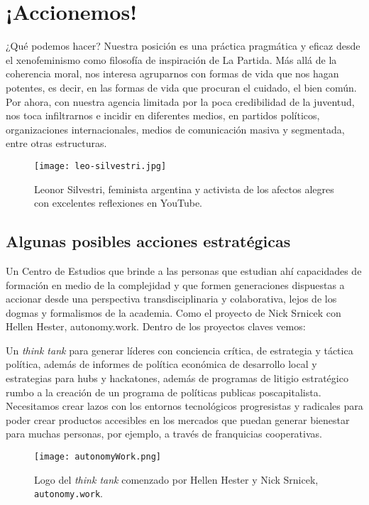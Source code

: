 \chapter{¡Accionemos!}
\label{cha:accionemos}

¿Qué podemos hacer? Nuestra posición es una práctica pragmática y eficaz desde el xenofeminismo como filosofía de inspiración de La Partida. Más allá de la coherencia moral, nos interesa agruparnos con formas de vida que nos hagan potentes, es decir, en las formas de vida que procuran el cuidado, el bien común. Por ahora, con nuestra agencia limitada por la poca credibilidad de la juventud, nos toca infiltrarnos e incidir en diferentes medios, en partidos políticos, organizaciones internacionales, medios de comunicación masiva y segmentada, entre otras estructuras.

\begin{figure}[htbp]
	\centering
	\texttt{[image: leo-silvestri.jpg]}
	\caption[Leonor Silvestri]{Leonor Silvestri, feminista argentina y activista de los afectos alegres con excelentes reflexiones en YouTube.}
	\label{fig:silvestri}
\end{figure}

\section{Algunas posibles acciones estratégicas}
\label{sec:posiblesacciones}

Un Centro de Estudios que brinde a las personas que estudian ahí capacidades de formación en medio de la complejidad y que formen generaciones dispuestas a accionar desde una perspectiva transdisciplinaria y colaborativa, lejos de los dogmas y formalismos de la academia. Como el proyecto de Nick Srnicek con Hellen Hester, autonomy.work. Dentro de los proyectos claves vemos:

Un \emph{think tank} para generar líderes con conciencia crítica, de estrategia y táctica política, además de informes de política económica de desarrollo local y estrategias para hubs y hackatones, además de programas de litigio estratégico rumbo a la creación de un programa de políticas publicas poscapitalista. Necesitamos crear lazos con los entornos tecnológicos progresistas y radicales para poder crear productos accesibles en los mercados que puedan generar bienestar para muchas personas, por ejemplo, a través de franquicias cooperativas.

\begin{figure}[htbp]
	\centering
	\texttt{[image: autonomyWork.png]}
	\caption{Logo del \emph{think tank} comenzado por Hellen Hester y Nick Srnicek, \texttt{autonomy.work}.}
	\label{fig:autonomywork}
\end{figure}

